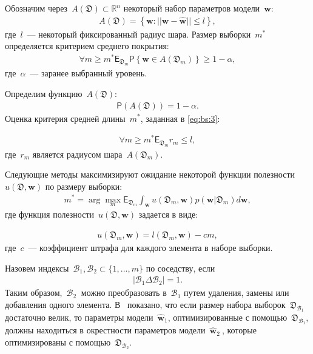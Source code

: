 Обозначим через~$A\left(\mathfrak{D}\right) \subset \mathbb{R}^n$ некоторый набор параметров модели~$\textbf{w}$:
\[
\label{eq:bs:2}
\begin{aligned}
	A\left(\mathfrak{D}\right) = \left\{\textbf{w}:||\textbf{w} - \hat{\textbf{w}}||\leq l\right\},
\end{aligned}
\]
где~$l$~--- некоторый фиксированный радиус шара.
Размер выборки~$m^*$ определяется критерием среднего покрытия:
\[
\label{eq:bs:3}
\begin{aligned}
	\forall m \geq m^*    \mathsf{E}_{\mathfrak{D}_m}\mathsf{P}\left\{\textbf{w} \in A\left(\mathfrak{D}_m\right)\right\} \geq 1-\alpha,
\end{aligned}
\]
где~$\alpha$~--- заранее выбранный уровень.

Определим функцию~$A\left(\mathfrak{D}\right)$:
\[
\label{eq:bs:4}
\begin{aligned}
	\mathsf{P}\left(A\left(\mathfrak{D}\right)\right) =  1- \alpha.
\end{aligned}
\]
Оценка критерия средней длины~$m^*$, заданная в \eqref{eq:bs:3}:

\[
\label{eq:bs:5}
\begin{aligned}
	\forall m \geq m^*    \mathsf{E}_{\mathfrak{D}_m}r_m\leq l,
\end{aligned}
\]
где~$r_m$ является радиусом шара~$A\left(\mathfrak{D}_{m}\right)$.

Следующие методы максимизируют ожидание некоторой функции полезности~$u\left(\mathfrak{D}, \textbf{w}\right)$ по размеру выборки:
\[
\label{eq:bs:6}
\begin{aligned}
	m^* = \arg\max_{m} \mathsf{E}_{\mathfrak{D}_m}\int_{\textbf{w}}u\left(\mathfrak{D}_m, \textbf{w}\right)p(\textbf{w}|\mathfrak{D}_m)d\textbf{w},
\end{aligned}
\]
где функция полезности~$u\left(\mathfrak{D}, \textbf{w}\right)$ задается в виде:

\[
\label{eq:bs:7}
\begin{aligned}
	u\left(\mathfrak{D}_m, \textbf{w}\right) = l\left(\mathfrak{D}_m, \textbf{w}\right) - cm,
\end{aligned}
\]
где~$c$~--- коэффициент штрафа для каждого элемента в наборе выборки.

Назовем индексы~$\mathcal{B}_1,\mathcal{B}_2 \subset \{1,...,m\}$ по соседству, если
\[
\label{eq:bs:8}
\begin{aligned}
	\left|\mathcal{B}_1 \Delta \mathcal{B}_2\right| = 1.
\end{aligned}
\]
Таким образом,~$\mathcal{B}_2~$ можно преобразовать в~$\mathcal{B}_1$ путем удаления, замены или добавления одного элемента. В~\cite{motrenko2014} показано, что если размер набора выборок~$\mathfrak {D}_{\mathcal {B}_1}$ достаточно велик, то параметры модели~$\hat{\textbf {w}}_1$, оптимизированные с помощью~$\mathfrak{D}_{\mathcal{B}_1}$, должны находиться в окрестности параметров модели~$\hat{\textbf{w}}_2~$, которые оптимизированы с помощью~$\mathfrak{D}_{\mathcal {B}_2}$.

